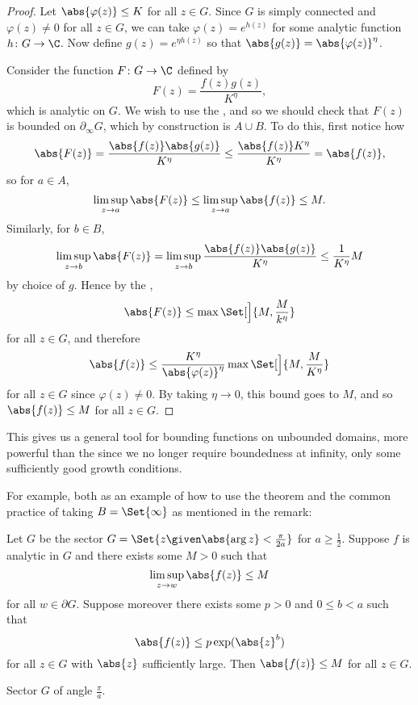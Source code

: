 \begin{proof}
	Let $\abs{\varphi(z)} \leq K$ for all $z \in G$.
	Since $G$ is simply connected and $\varphi(z) \neq 0$ for all $z \in G$, we can take $\varphi(z) = e^{h(z)}$ for some analytic function $h \colon G \to \C$.
	Now define $g(z) = e^{\eta h(z)}$ so that $\abs{g(z)} = \abs{\varphi(z)}^\eta$.

	Consider the function $F \colon G \to \C$ defined by
	\[
		F(z) = \frac{f(z) g(z)}{K^\eta},
	\]
	which is analytic on $G$.
	We wish to use the , and so we should check that $F(z)$ is bounded on $\partial_\infty G$, which by construction is $A \cup B$.
	To do this, first notice how
	\[
		\abs{F(z)} = \frac{\abs{f(z)} \abs{g(z)}}{K^\eta} \leq \frac{\abs{f(z)} K^\eta}{K^\eta} = \abs{f(z)},
	\]
	so for $a \in A$,
	\[
		\limsup_{z \to a} \abs{F(z)} \leq \limsup_{z \to a} \abs{f(z)} \leq M.
	\]
	Similarly, for $b \in B$,
	\[
		\limsup_{z \to b} \abs{F(z)} = \limsup_{z \to b} \frac{\abs{f(z)} \abs{g(z)}}{K^\eta} \leq \frac{1}{K^\eta} M
	\]
	by choice of $g$.
	Hence by the ,
	\[
		\abs{F(z)} \leq \max\Set[\Big]{M, \frac{M}{k^\eta}}
	\]
	for all $z \in G$, and therefore
	\[
		\abs{f(z)} \leq \frac{K^\eta}{\abs{\varphi(z)}^\eta} \max\Set[\Big]{M, \frac{M}{K^\eta}}
	\]
	for all $z \in G$ since $\varphi(z) \neq 0$.
	By taking $\eta \to 0$, this bound goes to $M$, and so $\abs{f(z)} \leq M$ for all $z \in G$.
\end{proof}

This gives us a general tool for bounding functions on unbounded domains, more powerful than the  since we no longer require boundedness at infinity, only some sufficiently good growth conditions.

For example, both as an example of how to use the theorem and the common practice of taking $B = \Set{\infty}$ as mentioned in the remark:

\begin{corollary}\label{cor6.11}
	Let $G$ be the sector $G = \Set{z \given \abs{\arg z} < \frac{\pi}{2 a}}$ for $a \geq \frac{1}{2}$.
	Suppose $f$ is analytic in $G$ and there exists some $M > 0$ such that
	\[
		\limsup_{z \to w} \abs{f(z)} \leq M
	\]
	for all $w \in \partial G$.
	Suppose moreover there exists some $p > 0$ and $0 \leq b < a$ such that
	\[
		\abs{f(z)} \leq p \exp(\abs{z}^b)
	\]
	for all $z \in G$ with $\abs{z}$ sufficiently large.
	Then $\abs{f(z)} \leq M$ for all $z \in G$.
\end{corollary}

\begin{marginfigure}
	\caption{\label{cor611:fig} Sector $G$ of angle $\frac{\pi}{a}$.}
\end{marginfigure}

